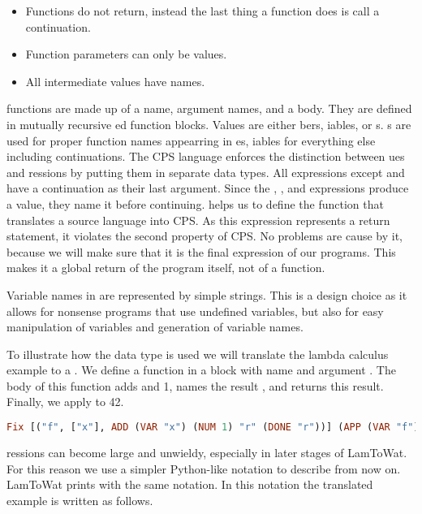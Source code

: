 {\begin{itemize}
\item Functions do not return, instead the last thing a function does is call a continuation.
\item Function parameters can only be values.
\item All intermediate values have names.
\end{itemize}

 functions are made up of a name, argument names, and a body. They are defined in mutually recursive ed function blocks. Values are either bers, iables, or s. s are used for proper function names appearring in es, iables for everything else including continuations. The \ac{CPS} language enforces the distinction between ues and ressions by putting them in separate data types. All expressions except  and  have a  continuation as their last argument. Since the , , and  expressions produce a value, they name it before continuing.  helps us to define the function that translates a source language into \ac{CPS}. As this expression represents a return statement, it violates the second property of \ac{CPS}. No problems are cause by it, because we will make sure that it is the final expression of our programs. This makes it a global return of the program itself, not of a function.

Variable names in  are represented by simple strings. This is a design choice as it allows for nonsense programs that use undefined variables, but also for easy manipulation of variables and generation of variable names.

To illustrate how the data type is used we will translate the lambda calculus example  to a . We define a function in a  block with name  and argument . The body of this function adds  and 1, names the result , and returns this result. Finally, we apply  to 42.

\begin{lstlisting}[language=Haskell]
  Fix [("f", ["x"], ADD (VAR "x") (NUM 1) "r" (DONE "r"))] (APP (VAR "f") [NUM 41])
\end{lstlisting}

ressions can become large and unwieldy, especially in later stages of LamToWat. For this reason we use a simpler Python-like notation to describe  from now on. LamToWat prints  with the same notation. In this notation the translated example is written as follows.

}
